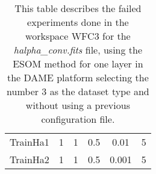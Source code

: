 \documentclass[11pt,fleqn]{book} %
\begin{document}
\begin{table}[h!]
\begin{tabular}{ c c c c c c }
																																																																																																																																																																																																																																																			          TrainHa1 & 1 & 1 & 0.5 & 0.01 & 5\\
																																																																																																																																																																																																																																																				      TrainHa2 & 1 & 1 & 0.5 & 0.001 & 5\\
																																																																																																																																																																																																																																																				          
																																																																																																																																																																																																																																																					      \hline
																																																																																																																																																																																																																																																					        \end{tabular}
																																																																																																																																																																																																																																																						  \caption{This table describes the failed experiments done in the workspace WFC3 for the \emph{halpha\_conv.fits} file, using the ESOM method for one layer in the DAME platform selecting the number 3 as the dataset type and without using a previous configuration file.}
																																																																																																																																																																																																																																																						    \label{tab:hafailed}
																																																																																																																																																																																																																																																						    \end{table}
\end{document}
